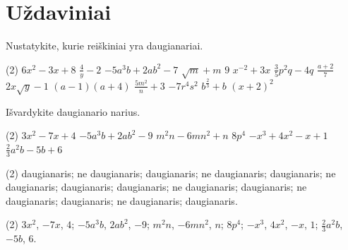 \documentclass[11pt,a4paper]{scrartcl}
\begin{document}
\section{Uždaviniai}

\begin{problem}
Nustatykite, kurie reiškiniai yra daugianariai.
\begin{tasks}[label={(\arabic*)}, label-offset=0.9em](2)
	\task $6x^2-3x+8$
	\task $\frac{4}{y}-2$
	\task $-5a^3b+2ab^2-7$
	\task $\sqrt{m}+m$
	\task $9$
	\task $x^{-2}+3x$
	\task $\frac{3}{5}p^2q-4q$
	\task $\frac{a+2}{7}$
	\task $2x\sqrt{y}-1$
	\task $(a-1)(a+4)$
	\task $\frac{5m^2}{n}+3$
	\task $-7r^4s^2$
	\task $b^{\frac{2}{3}}+b$
	\task $(x+2)^2$
\end{tasks}
\end{problem}

\begin{problem}
Išvardykite daugianario narius.
\begin{tasks}[label={(\arabic*)}, label-offset=0.9em](2)
	\task $3x^2-7x+4$
	\task $-5a^3b+2ab^2-9$
	\task $m^2n-6mn^2+n$
	\task $8p^4$
	\task $-x^3+4x^2-x+1$
	\task $\frac{2}{3}a^2b-5b+6$
\end{tasks}
\end{problem}

\newpage
\answerssection

\begin{problem} \phantom{text}
\begin{tasks}[label={(\arabic*)}, label-offset=0.9em](2)
	\task daugianaris;
	\task ne daugianaris;
	\task daugianaris;
	\task ne daugianaris;
	\task daugianaris;
	\task ne daugianaris;
	\task daugianaris;
	\task daugianaris;
	\task ne daugianaris;
	\task daugianaris;
	\task ne daugianaris;
	\task daugianaris;
	\task ne daugianaris;
	\task daugianaris.
\end{tasks}
\end{problem}

\begin{problem} \phantom{text}
\begin{tasks}[label={(\arabic*)}, label-offset=0.9em](2)
	\task $3x^2$, $-7x$, $4$;
	\task $-5a^3b$, $2ab^2$, $-9$;
	\task $m^2n$, $-6mn^2$, $n$;
	\task $8p^4$;
	\task $-x^3$, $4x^2$, $-x$, $1$;
	\task $\frac{2}{3}a^2b$, $-5b$, $6$.
\end{tasks}
\end{problem}
\end{document}
